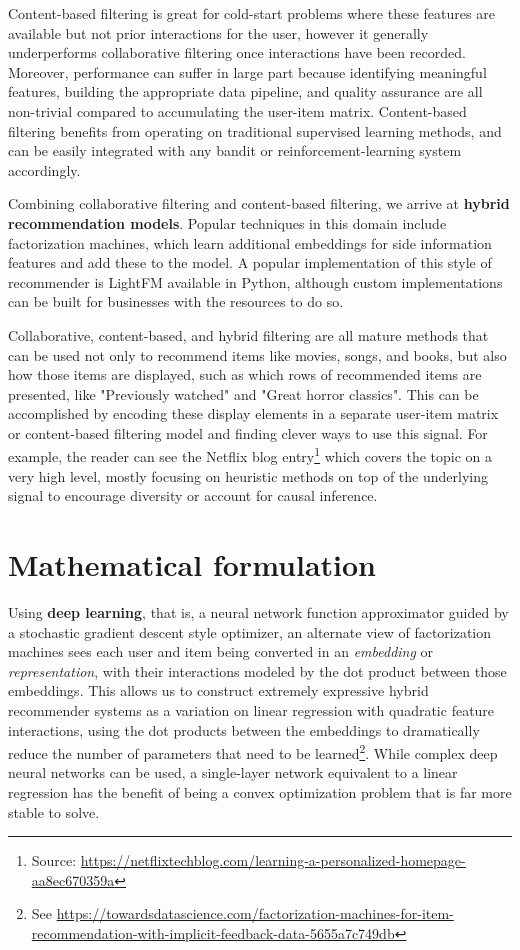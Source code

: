 \documentclass{article}
\begin{document}
Content-based filtering is great for cold-start problems where these features are available but not prior interactions for the user, however it generally underperforms collaborative filtering once interactions have been recorded. Moreover, performance can suffer in large part because identifying meaningful features, building the appropriate data pipeline, and quality assurance are all non-trivial compared to accumulating the user-item matrix. Content-based filtering benefits from operating on traditional supervised learning methods, and can be easily integrated with any bandit or reinforcement-learning system accordingly.

Combining collaborative filtering and content-based filtering, we arrive at \textbf{hybrid recommendation models}\cite{hybrid_recommender, hybrid_recommender2}. Popular techniques in this domain include factorization machines\cite{factorization_machines, deep_factorization_machines}, which learn additional embeddings for side information features and add these to the model. A popular implementation of this style of recommender is LightFM\cite{lightFM, xLightFM} available in Python, although custom implementations can be built for businesses with the resources to do so. 

Collaborative, content-based, and hybrid filtering are all mature methods that can be used not only to recommend items like movies, songs, and books, but also how those items are displayed, such as which rows of recommended items are presented, like "Previously watched" and "Great horror classics". This can be accomplished by encoding these display elements in a separate user-item matrix or content-based filtering model and finding clever ways to use this signal. For example, the reader can see the Netflix blog entry\footnote{Source: \url{https://netflixtechblog.com/learning-a-personalized-homepage-aa8ec670359a}} which covers the topic on a very high level, mostly focusing on heuristic methods on top of the underlying signal to encourage diversity or account for causal inference.

\section{Mathematical formulation}

Using \textbf{deep learning}, that is, a neural network function approximator guided by a stochastic gradient descent style optimizer, an alternate view of factorization machines sees each user and item being converted in an \textit{embedding} or \textit{representation}, with their interactions modeled by the dot product between those embeddings. This allows us to construct extremely expressive hybrid recommender systems as a variation on linear regression with quadratic feature interactions, using the dot products between the embeddings to dramatically reduce the number of parameters that need to be learned\footnote{See \url{https://towardsdatascience.com/factorization-machines-for-item-recommendation-with-implicit-feedback-data-5655a7c749db}}. While complex deep neural networks can be used, a single-layer network equivalent to a linear regression has the benefit of being a convex optimization problem that is far more stable to solve.
\end{document}
